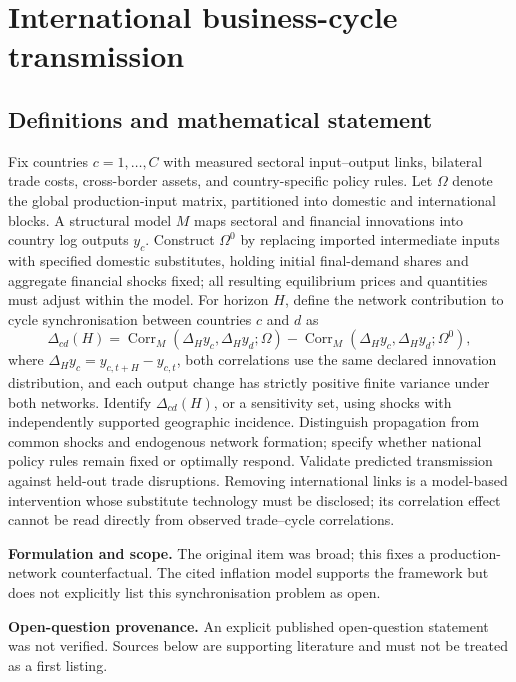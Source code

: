 \documentclass[11pt]{article}
\begin{document}
\section*{International business-cycle transmission}\label{30007519}
\subsection{Definitions and mathematical statement}
Fix countries \(c=1,\ldots,C\) with measured sectoral input–output links, bilateral trade costs, cross-border assets, and country-specific policy rules. Let \(\Omega\) denote the global production-input matrix, partitioned into domestic and international blocks. A structural model \(M\) maps sectoral and financial innovations into country log outputs \(y_c\). Construct \(\Omega^0\) by replacing imported intermediate inputs with specified domestic substitutes, holding initial final-demand shares and aggregate financial shocks fixed; all resulting equilibrium prices and quantities must adjust within the model.
For horizon \(H\), define the network contribution to cycle synchronisation between countries \(c\) and \(d\) as
\[
\Delta_{cd}(H)=\operatorname{Corr}_M(\Delta_H y_c,\Delta_H y_d;\Omega)
-\operatorname{Corr}_M(\Delta_H y_c,\Delta_H y_d;\Omega^0),
\]
where \(\Delta_H y_c=y_{c,t+H}-y_{c,t}\), both correlations use the same declared innovation distribution, and each output change has strictly positive finite variance under both networks. Identify \(\Delta_{cd}(H)\), or a sensitivity set, using shocks with independently supported geographic incidence. Distinguish propagation from common shocks and endogenous network formation; specify whether national policy rules remain fixed or optimally respond. Validate predicted transmission against held-out trade disruptions. Removing international links is a model-based intervention whose substitute technology must be disclosed; its correlation effect cannot be read directly from observed trade–cycle correlations.

\par\textbf{Formulation and scope.} The original item was broad; this fixes a production-network counterfactual. The cited inflation model supports the framework but does not explicitly list this synchronisation problem as open.

\par\textbf{Open-question provenance.} An explicit published open-question statement was not verified. Sources below are supporting literature and must not be treated as a first listing.
\end{document}
